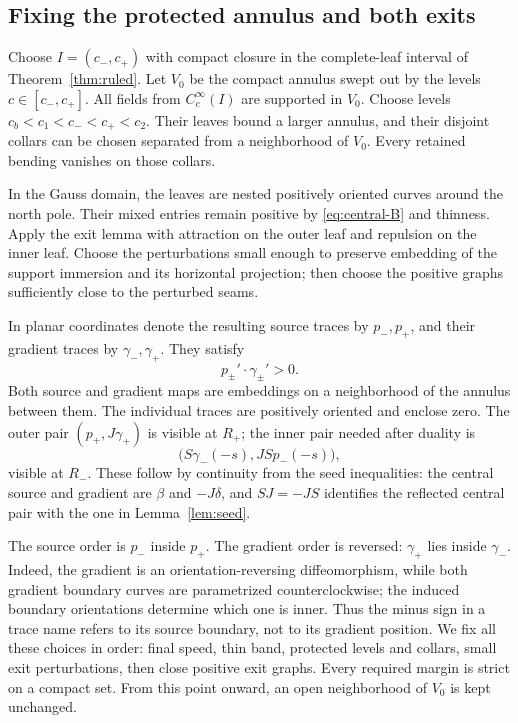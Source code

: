 \documentclass[11pt]{amsart}
\theoremstyle{definition}
\theoremstyle{remark}
\numberwithin{equation}{section}
\begin{document}
\subsection{Fixing the protected annulus and both exits}
Choose $I=(c_-,c_+)$ with compact closure in the complete-leaf interval
of Theorem~\ref{thm:ruled}. Let $V_0$ be the compact annulus swept out
by the levels $c\in[c_-,c_+]$. All fields from $C_c^\infty(I)$ are
supported in $V_0$. Choose levels
$c_b<c_1<c_-<c_+<c_2$. Their leaves bound a larger annulus, and their
disjoint collars can be chosen separated from a neighborhood of $V_0$.
Every retained bending vanishes on those collars.

In the Gauss domain, the leaves are nested positively oriented curves
around the north pole. Their mixed entries remain positive by
\eqref{eq:central-B} and thinness. Apply the exit lemma with attraction
on the outer leaf and repulsion on the inner leaf. Choose the perturbations
small enough to preserve embedding of the support immersion and its
horizontal projection; then choose the positive graphs sufficiently close
to the perturbed seams.

In planar coordinates denote the resulting source traces by $p_-,p_+$,
and their gradient traces by $\gamma_-,\gamma_+$. They satisfy
\begin{equation}\label{eq:positive-traces}
 p_\pm'\cdot\gamma_\pm'>0.
\end{equation}
Both source and gradient maps are embeddings on a neighborhood of the
annulus between them. The individual traces are positively oriented and
enclose zero. The outer pair $(p_+,J\gamma_+)$ is visible at $R_+$;
the inner pair needed after duality is
\begin{equation}\label{eq:reflected-visible}
 \bigl(S\gamma_-(-s),JS p_-(-s)\bigr),
\end{equation}
visible at $R_-$. These follow by continuity from the seed inequalities:
the central source and gradient are $\beta$ and $-J\delta$, and
$SJ=-JS$ identifies the reflected central pair with the one in
Lemma~\ref{lem:seed}.

The source order is $p_-$ inside $p_+$. The gradient order is reversed:
$\gamma_+$ lies inside $\gamma_-$. Indeed, the gradient is an
orientation-reversing diffeomorphism, while both gradient boundary
curves are parametrized counterclockwise; the induced boundary
orientations determine which one is inner. Thus the minus sign in a
trace name refers to its source boundary, not to its gradient position. We fix all these choices in order: final speed, thin
band, protected levels and collars, small exit perturbations, then close
positive exit graphs. Every required margin is strict on a compact set.
From this point onward, an open neighborhood of $V_0$ is kept unchanged.
\end{document}
